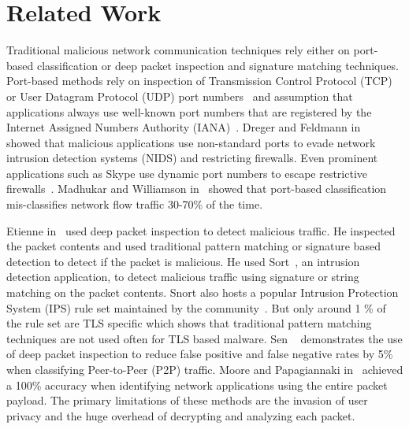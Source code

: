 \chapter{Related Work\label{chap:related}}

Traditional malicious network communication techniques rely either on port-based classification or deep packet inspection and signature matching techniques. Port-based methods rely on inspection of Transmission Control Protocol (TCP) or User Datagram Protocol (UDP) port numbers~\cite{YoonPPOK09} and assumption that applications always use well-known port numbers that are registered by the Internet Assigned Numbers Authority (IANA)~\cite{IANA}. Dreger and Feldmann in~\cite{DregerF06} showed that malicious applications use non-standard ports to evade network intrusion detection systems (NIDS) and restricting firewalls. Even prominent applications such as Skype use dynamic port numbers to escape restrictive firewalls~\cite{BasetS06}. Madhukar and Williamson in~\cite{MadhukarW06} showed that port-based classification mis-classifies network flow traffic 30-70\% of the time. 

Etienne in~\cite{Etienne} used deep packet inspection to detect malicious traffic. He inspected the packet contents and used traditional pattern matching or signature based detection to detect if the packet is malicious. He used Sort~\cite{Snort}, an intrusion detection application, to detect malicious traffic using signature or string matching on the packet contents. Snort also hosts a popular Intrusion Protection System (IPS) rule set maintained by the community~\cite{SnortCR}. But only around 1 \% of the rule set are TLS specific which shows that traditional pattern matching techniques are not used often for TLS based malware. Sen \etal~\cite{SenSW04} demonstrates the use of deep packet inspection to reduce false positive and false negative rates by 5\% when classifying Peer-to-Peer (P2P) traffic. Moore and Papagiannaki in~\cite{MooreP05} achieved a 100\% accuracy when identifying network applications using the entire packet payload. The primary limitations of these methods are the invasion of user privacy and the huge overhead of decrypting and analyzing each packet.

